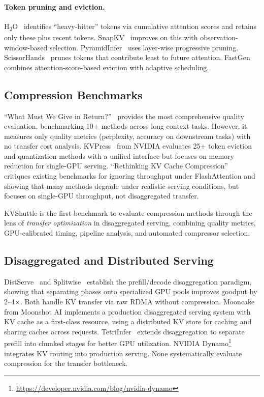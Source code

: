 \documentclass{article}
\begin{document}
\paragraph{Token pruning and eviction.} H\textsubscript{2}O~\citep{zhang2024h2o} identifies ``heavy-hitter'' tokens via cumulative attention scores and retains only these plus recent tokens. SnapKV~\citep{li2024snapkv} improves on this with observation-window-based selection. PyramidInfer~\citep{yang2024pyramidinfer} uses layer-wise progressive pruning. ScissorHands~\citep{liu2024scissorhands} prunes tokens that contribute least to future attention. FastGen~\citep{ge2024fastgen} combines attention-score-based eviction with adaptive scheduling.

\subsection{Compression Benchmarks}

``What Must We Give in Return?''~\citep{yuan2024kvbenchmark} provides the most comprehensive quality evaluation, benchmarking 10+ methods across long-context tasks. However, it measures only quality metrics (perplexity, accuracy on downstream tasks) with no transfer cost analysis. KVPress~\citep{kvpress2025} from NVIDIA evaluates 25+ token eviction and quantization methods with a unified interface but focuses on memory reduction for single-GPU serving. ``Rethinking KV Cache Compression''~\citep{rethinking2025} critiques existing benchmarks for ignoring throughput under FlashAttention and showing that many methods degrade under realistic serving conditions, but focuses on single-GPU throughput, not disaggregated transfer.

KVShuttle is the first benchmark to evaluate compression methods through the lens of \emph{transfer optimization} in disaggregated serving, combining quality metrics, GPU-calibrated timing, pipeline analysis, and automated compressor selection.

\subsection{Disaggregated and Distributed Serving}

DistServe~\citep{zhong2024distserve} and Splitwise~\citep{patel2024splitwise} establish the prefill/decode disaggregation paradigm, showing that separating phases onto specialized GPU pools improves goodput by 2--4$\times$. Both handle KV transfer via raw RDMA without compression. Mooncake~\citep{qin2024mooncake} from Moonshot AI implements a production disaggregated serving system with KV cache as a first-class resource, using a distributed KV store for caching and sharing caches across requests. TetriInfer~\citep{hu2024tetriinfer} extends disaggregation to separate prefill into chunked stages for better GPU utilization. NVIDIA Dynamo\footnote{\url{https://developer.nvidia.com/blog/nvidia-dynamo}} integrates KV routing into production serving. None systematically evaluate compression for the transfer bottleneck.
\end{document}
